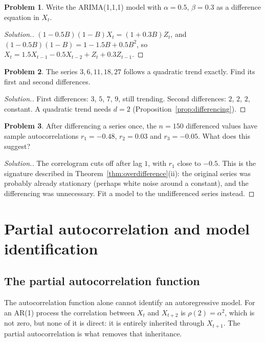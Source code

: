 \documentclass[11pt,a4paper]{article}
\theoremstyle{definition}
\newtheorem{problemx}{Problem}[subsection]
\newenvironment{problem}{\begin{problemx}}{\end{problemx}}
\newenvironment{solution}
  {\renewcommand{\qedsymbol}{}\begin{proof}[\textit{Solution}.]}
  {\end{proof}}
\begin{document}
\begin{problem}\label{prob:arima111}
Write the ARIMA(1,1,1) model with $\alpha = 0.5$, $\beta = 0.3$ as a difference equation in $X_t$.
\end{problem}

\begin{solution}
$(1 - 0.5B)(1 - B)X_t = (1 + 0.3B)Z_t$, and $(1 - 0.5B)(1 - B) = 1 - 1.5B + 0.5B^2$, so $X_t = 1.5X_{t-1} - 0.5X_{t-2} + Z_t + 0.3Z_{t-1}$.
\end{solution}

\begin{problem}\label{prob:second-diff}
The series $3, 6, 11, 18, 27$ follows a quadratic trend exactly. Find its first and second differences.
\end{problem}

\begin{solution}
First differences: $3$, $5$, $7$, $9$, still trending. Second differences: $2$, $2$, $2$, constant. A quadratic trend needs $d = 2$
(Proposition~\ref{prop:differencing}).
\end{solution}

\begin{problem}\label{prob:overdiff}
After differencing a series once, the $n = 150$ differenced values have sample autocorrelations
$r_1 = -0.48$, $r_2 = 0.03$ and $r_3 = -0.05$. What does this suggest?
\end{problem}

\begin{solution}
The correlogram cuts off after lag $1$, with $r_1$ close to $-0.5$. This is the signature described in
Theorem~\ref{thm:overdifference}(ii): the original series was
probably already stationary (perhaps white noise around a constant), and the differencing was unnecessary.
Fit a model to the undifferenced series instead.
\end{solution}

\pagebreak
\section{Partial autocorrelation and model identification}\label{sec:pacf}
\subsection{The partial autocorrelation function}
The autocorrelation function alone cannot identify an autoregressive model. For an AR(1) process the
correlation between $X_t$ and $X_{t+2}$ is $\rho(2) = \alpha^2$, which is not zero, but none of it is direct: it is entirely inherited through
$X_{t+1}$. The partial autocorrelation is what removes that inheritance.
\end{document}
